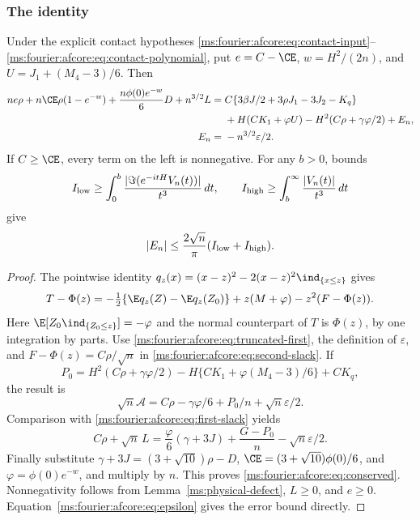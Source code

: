 \subsubsection{The identity}

\begin{proposition}\label{ms:fourier:afcore:prop:conserved}
Under the explicit contact hypotheses
\eqref{ms:fourier:afcore:eq:contact-input}--\eqref{ms:fourier:afcore:eq:contact-polynomial},
put $e=C-\CE$, $w=H^2/(2n)$, and
$U=J_1+(M_4-3)/6$. Then
\begin{align}
 ne\rho+n\CE\rho(1-e^{-w})
  +\frac{n\phi(0)e^{-w}}6D+n^{3/2}L
 ={}&C\{3\beta J/2+3\rho J_1-3J_2-K_q\}\nonumber\\
 &+H(CK_1+\varphi U)
   -H^2(C\rho+\gamma\varphi/2)+E_n,
 \label{ms:fourier:afcore:eq:conserved}\\
 E_n={}&-n^{3/2}\varepsilon/2.\nonumber
\end{align}
If $C\ge\CE$, every term on the left is nonnegative.
For any $b>0$, bounds
\[
 I_{\rm low}\ge\int_0^b
       \frac{|\Im(e^{-itH}V_n(t))|}{t^3}\,dt,\qquad
 I_{\rm high}\ge\int_b^\infty\frac{|V_n(t)|}{t^3}\,dt
\]
give
\begin{equation}\label{ms:fourier:afcore:eq:error-ledger}
 |E_n|\le\frac{2\sqrt n}{\pi}(I_{\rm low}+I_{\rm high}).
\end{equation}
\end{proposition}
\begin{proof}
The pointwise identity
$q_z(x)=(x-z)^2-2(x-z)^2\ind_{\{x\le z\}}$ gives
\[
 T-\Phi(z)=-\tfrac12\{\E q_z(Z)-\E q_z(Z_0)\}
             +z(M+\varphi)-z^2(F-\Phi(z)).
\]
Here $\E[Z_0\ind_{\{Z_0\le z\}}]=-\varphi$ and the normal counterpart
of $T$ is $\Phi(z)$, by one integration by parts.
Use \eqref{ms:fourier:afcore:eq:truncated-first}, the definition of $\varepsilon$,
and $F-\Phi(z)=C\rho/\sqrt n$ in \eqref{ms:fourier:afcore:eq:second-slack}.
If
\[
 P_0=H^2(C\rho+\gamma\varphi/2)
    -H\{CK_1+\varphi(M_4-3)/6\}+CK_q,
\]
the result is
\[
 \sqrt n\mathcal A=C\rho-\gamma\varphi/6+P_0/n+\sqrt n\varepsilon/2.
\]
Comparison with \eqref{ms:fourier:afcore:eq:first-slack} yields
\[
 C\rho+\sqrt n\,L=\frac{\varphi}{6}(\gamma+3J)
                     +\frac{G-P_0}{n}-\sqrt n\varepsilon/2.
\]
Finally substitute
$\gamma+3J=(3+\sqrt{10})\rho-D$,
$\CE=(3+\sqrt{10})\phi(0)/6$, and
$\varphi=\phi(0)e^{-w}$, and multiply by $n$.
This proves \eqref{ms:fourier:afcore:eq:conserved}. Nonnegativity follows from
Lemma~\ref{ms:physical-defect}, $L\ge0$, and $e\ge0$.
Equation~\eqref{ms:fourier:afcore:eq:epsilon} gives the error bound directly.
\end{proof}


